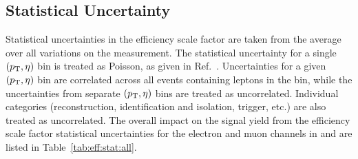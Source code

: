 \subsection{Statistical Uncertainty}
Statistical uncertainties in the efficiency scale factor are taken from the average over all variations on the measurement. The statistical uncertainty for a single $(p_{\mathrm{T}},\eta)$ bin is treated as Poisson, as given in Ref.~\cite{Paterno:2004cb}. Uncertainties for a given $(p_{\mathrm{T}},\eta)$ bin are correlated across all events containing leptons in the bin, while the uncertainties from separate $(p_{\mathrm{T}},\eta)$ bins are treated as uncorrelated. Individual categories (reconstruction, identification and isolation, trigger, etc.) are also treated as uncorrelated. The overall impact on the signal yield from the efficiency scale factor statistical uncertainties for the electron and muon channels in \serag and \serah are listed in Table~\ref{tab:eff:stat:all}.


% 
% 
% 
% 
% 
% 



